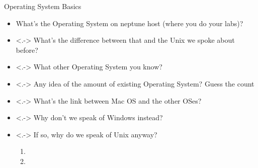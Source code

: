 \begin{frame}{Operating System Basics}
  \begin{itemize}
  \item<+-> What's the Operating System on neptune host (where you do your labs)?\\
  \item<.-> What's the difference between that and the Unix we spoke about
    before?\\ 
  \item<.-> What other Operating System you know?\\
  \item<.-> Any idea of the amount of existing Operating System? Guess the
    count\\
  \item<.-> What's the link between Mac OS and the other OSes?\\
  \item<.-> Why don't we speak of Windows instead?\\
  \item<.-> If so, why do we speak of Unix anyway?
    \begin{enumerate}
    \item {}
    \item {}
    \end{enumerate}
  \end{itemize}
\end{frame}
